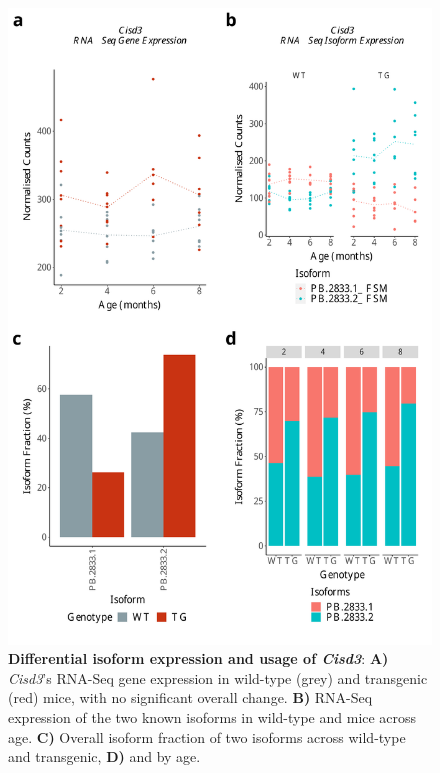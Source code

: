 \begin{figure}[htp]
	\begin{center}
		\includegraphics[page=1,scale = 0.55]{Figures/DIU_notDEG_major.pdf}
	\end{center}
	\captionsetup{width=0.95\textwidth}
	\caption[Differential isoform expression and usage of \textit{Cisd3}]%
	{\textbf{Differential isoform expression and usage of \textit{Cisd3}}: \textbf{A)} \textit{Cisd3}'s RNA-Seq gene expression in wild-type (grey) and transgenic (red) mice, with no significant overall change. \textbf{B)} RNA-Seq expression of the two known isoforms in wild-type and mice across age. \textbf{C)} Overall isoform fraction of two isoforms across wild-type and transgenic, \textbf{D)} and by age.}    
	\label{fig:DIU_Cisd3}
\end{figure}


